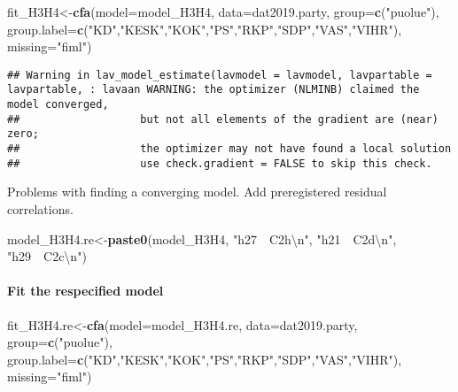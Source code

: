 \documentclass[
]{article}
\newenvironment{Shaded}{\begin{snugshade}}{\end{snugshade}}
\newcommand{\CharTok}[1]{\textcolor[rgb]{0.31,0.60,0.02}{#1}}
\newcommand{\DataTypeTok}[1]{\textcolor[rgb]{0.13,0.29,0.53}{#1}}
\newcommand{\KeywordTok}[1]{\textcolor[rgb]{0.13,0.29,0.53}{\textbf{#1}}}
\newcommand{\NormalTok}[1]{#1}
\newcommand{\StringTok}[1]{\textcolor[rgb]{0.31,0.60,0.02}{#1}}
\begin{document}
\begin{Shaded}
\begin{Highlighting}[]
\NormalTok{fit_H3H4<-}\KeywordTok{cfa}\NormalTok{(}\DataTypeTok{model=}\NormalTok{model_H3H4,}
              \DataTypeTok{data=}\NormalTok{dat2019.party,}
              \DataTypeTok{group=}\KeywordTok{c}\NormalTok{(}\StringTok{"puolue"}\NormalTok{),}
              \DataTypeTok{group.label=}\KeywordTok{c}\NormalTok{(}\StringTok{"KD"}\NormalTok{,}\StringTok{"KESK"}\NormalTok{,}\StringTok{"KOK"}\NormalTok{,}\StringTok{"PS"}\NormalTok{,}\StringTok{"RKP"}\NormalTok{,}\StringTok{"SDP"}\NormalTok{,}\StringTok{"VAS"}\NormalTok{,}\StringTok{"VIHR"}\NormalTok{),}
              \DataTypeTok{missing=}\StringTok{"fiml"}\NormalTok{)}
\end{Highlighting}
\end{Shaded}

\begin{verbatim}
## Warning in lav_model_estimate(lavmodel = lavmodel, lavpartable = lavpartable, : lavaan WARNING: the optimizer (NLMINB) claimed the model converged,
##                   but not all elements of the gradient are (near) zero;
##                   the optimizer may not have found a local solution
##                   use check.gradient = FALSE to skip this check.
\end{verbatim}

Problems with finding a converging model. Add preregistered residual
correlations.

\begin{Shaded}
\begin{Highlighting}[]
\NormalTok{model_H3H4.re<-}\KeywordTok{paste0}\NormalTok{(model_H3H4,}
                      \StringTok{"h27~~C2h}\CharTok{\textbackslash{}n}\StringTok{"}\NormalTok{,}
                      \StringTok{"h21~~C2d}\CharTok{\textbackslash{}n}\StringTok{"}\NormalTok{,}
                      \StringTok{"h29~~C2c}\CharTok{\textbackslash{}n}\StringTok{"}\NormalTok{)}
\end{Highlighting}
\end{Shaded}

\hypertarget{fit-the-respecified-model-1}{%
\paragraph{Fit the respecified
model}\label{fit-the-respecified-model-1}}

\begin{Shaded}
\begin{Highlighting}[]
\NormalTok{fit_H3H4.re<-}\KeywordTok{cfa}\NormalTok{(}\DataTypeTok{model=}\NormalTok{model_H3H4.re,}
              \DataTypeTok{data=}\NormalTok{dat2019.party,}
              \DataTypeTok{group=}\KeywordTok{c}\NormalTok{(}\StringTok{"puolue"}\NormalTok{),}
              \DataTypeTok{group.label=}\KeywordTok{c}\NormalTok{(}\StringTok{"KD"}\NormalTok{,}\StringTok{"KESK"}\NormalTok{,}\StringTok{"KOK"}\NormalTok{,}\StringTok{"PS"}\NormalTok{,}\StringTok{"RKP"}\NormalTok{,}\StringTok{"SDP"}\NormalTok{,}\StringTok{"VAS"}\NormalTok{,}\StringTok{"VIHR"}\NormalTok{),}
              \DataTypeTok{missing=}\StringTok{"fiml"}\NormalTok{)}
\end{Highlighting}
\end{Shaded}
\end{document}
